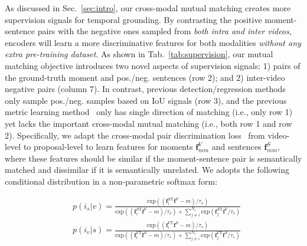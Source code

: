 \documentclass[letterpaper]{article} \usepackage{aaai22}  \usepackage{times}  \usepackage{helvet}  \usepackage{courier}  \usepackage[hyphens]{url}  \usepackage{graphicx} \urlstyle{rm} \def\UrlFont{\rm}  \usepackage{natbib}  \usepackage{caption} \DeclareCaptionStyle{ruled}{labelfont=normalfont,labelsep=colon,strut=off} \frenchspacing  \setlength{\pdfpagewidth}{8.5in}  \setlength{\pdfpageheight}{11in}  \usepackage{algorithm}
\begin{document}
 As discussed in Sec.~\ref{sec:intro}, our cross-modal mutual matching creates more supervision signals for temporal grounding. By contrasting the positive moment-sentence pairs with the negative ones sampled from {\em both intra and inter videos}, encoders will learn a more discriminative features for both modalities {\em without any extra pre-training dataset}. As shown in Tab.~\ref{tab:supervision}, our mutual matching objective introduces two novel aspects of supervision signals: 1) pairs of the ground-truth moment and pos./neg. sentences (row 2); and 2) inter-video negative pairs (column 7). In contrast, previous detection/regression methods only sample pos./neg. samples based on IoU signals (row 3), and the previous metric learning method~\cite{DBLP:conf/iccv/HendricksWSSDR17} only has single direction of matching (i.e., only row 1) yet lacks the important cross-modal mutual matching (i.e., both row 1 and row 2). Specifically, we adapt the cross-modal pair discrimination loss~\cite{DBLP:journals/corr/abs-2001-05691} from video-level to proposal-level to learn features for moments $\mathbf{f}_{mm}^V$ and sentences $\mathbf{f}_{mm}^S$, where these features should be similar if the moment-sentence pair is semantically matched and dissimilar if it is semantically unrelated. We adopts the following conditional distribution in a non-parametric softmax form:
\begin{small}
\begin{equation}
\begin{aligned}
&p(i_s|v) = \frac{\text{exp}\left((\mathbf{f}_i^{S \mathrm{T}} \mathbf{f}^V -m)/\tau_v\right)}{\text{exp}\left((\mathbf{f}_i^{S \mathrm{T}} \mathbf{f}^V -m)/\tau_v\right) + \sum_{j\neq i}^{N_s} \text{exp} \left(\mathbf{f}_j^{S \mathrm{T}} \mathbf{f}^V /\tau_v\right)} \\
&p(i_v|s) = \frac{\text{exp}\left((\mathbf{f}_i^{V \mathrm{T}} \mathbf{f}^S -m)/\tau_s\right)}{\text{exp}\left((\mathbf{f}_i^{V \mathrm{T}} \mathbf{f}^S -m)/\tau_s\right) + \sum_{j\neq i}^{N_v} \text{exp} \left(\mathbf{f}_j^{V \mathrm{T}} \mathbf{f}^S /\tau_s\right)} \\
\end{aligned}
\end{equation}
\end{small}
\end{document}
